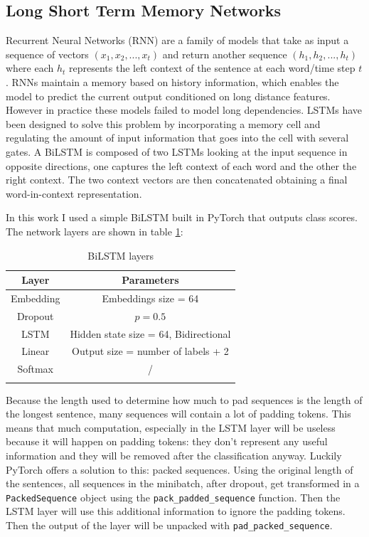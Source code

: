 \documentclass[journal]{IEEEtran}
\begin{document}
\subsection{Long Short Term Memory Networks}\label{sec:lstm}
Recurrent Neural Networks (RNN) are a family of models that take as input a sequence of vectors $(x_1, x_2, ..., x_t)$ and return another sequence $(h_1, h_2, ..., h_t)$ where each $h_t$ represents the left context of the sentence at each word/time step $t$. RNNs maintain a memory based on history information, which enables the model to predict the current output conditioned on long distance features. However in practice these models failed to model long dependencies. 
LSTMs have been designed to solve this problem by incorporating a memory cell and regulating the amount of input information that goes into the cell with several gates. A BiLSTM is composed of two LSTMs looking at the input sequence in opposite directions, one captures the left context of each word and the other the right context. The two context vectors are then concatenated obtaining a final word-in-context representation.

In this work I used a simple BiLSTM built in PyTorch that outputs class scores. The network layers are shown in table \ref{tab:bilstm-layers}:

\begin{table}[h]
\centering
\begin{tabular}{@{}cc@{}}
\toprule
\textbf{Layer} & \textbf{Parameters}                   \\ \midrule
Embedding      & Embeddings size = 64                  \\
Dropout        & $p = 0.5$                             \\
LSTM           & Hidden state size = 64, Bidirectional \\
Linear         & Output size = number of labels + 2    \\
Softmax        & /                                     \\ \bottomrule\\
\end{tabular}
\caption{BiLSTM layers}
\label{tab:bilstm-layers}
\end{table}

Because the length used to determine how much to pad sequences is the length of the longest sentence, many sequences will contain a lot of padding tokens.
This means that much computation, especially in the LSTM layer will be useless because it will happen on padding tokens: they don't represent any useful information and they will be removed after the classification anyway. 
Luckily PyTorch offers a solution to this: packed sequences. Using the original length of the sentences, all sequences in the minibatch, after dropout, get transformed in a \texttt{PackedSequence} object using the \texttt{pack\_padded\_sequence} function. Then the LSTM layer will use this additional information to ignore the padding tokens. Then the output of the layer will be unpacked with \texttt{pad\_packed\_sequence}.
\end{document}
